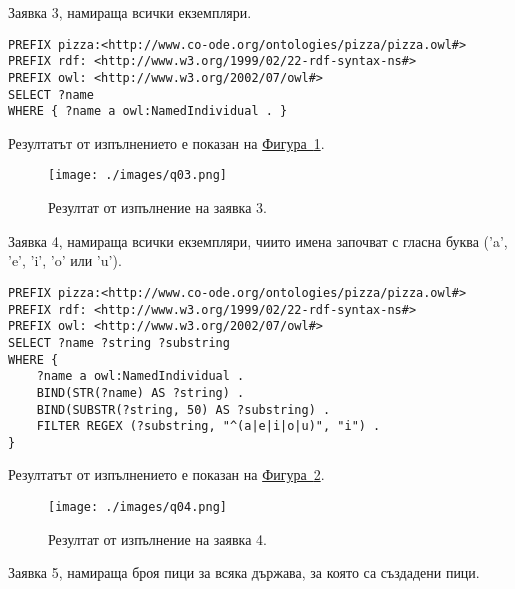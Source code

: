 \documentclass[12pt]{article}
\begin{document}
        Заявка 3, намираща всички екземпляри.
        
        \begin{lstlisting}[language=SPARQL,style=sparql]
PREFIX pizza:<http://www.co-ode.org/ontologies/pizza/pizza.owl#>
PREFIX rdf: <http://www.w3.org/1999/02/22-rdf-syntax-ns#>
PREFIX owl: <http://www.w3.org/2002/07/owl#>
SELECT ?name
WHERE { ?name a owl:NamedIndividual . }\end{lstlisting}

        Резултатът от изпълнението е показан на \hyperref[fig:q03]{Фигура~\ref*{fig:q03}}.

        \begin{center}
            \begin{figure}
            \centering
                \texttt{[image: ./images/q03.png]}
                \caption{Резултат от изпълнение на заявка 3.}
                \label{fig:q03}
            \end{figure}
        \end{center}

\clearpage
\pagebreak

        Заявка 4, намираща всички екземпляри, чиито имена започват с гласна буква ('a', 'e', 'i', 'o' или 'u').
        
        \begin{lstlisting}[language=SPARQL,style=sparql]
PREFIX pizza:<http://www.co-ode.org/ontologies/pizza/pizza.owl#>
PREFIX rdf: <http://www.w3.org/1999/02/22-rdf-syntax-ns#>
PREFIX owl: <http://www.w3.org/2002/07/owl#>
SELECT ?name ?string ?substring
WHERE {
    ?name a owl:NamedIndividual .
    BIND(STR(?name) AS ?string) .
    BIND(SUBSTR(?string, 50) AS ?substring) .
    FILTER REGEX (?substring, "^(a|e|i|o|u)", "i") .
}\end{lstlisting}

        Резултатът от изпълнението е показан на \hyperref[fig:q04]{Фигура~\ref*{fig:q04}}.

        \begin{center}
            \begin{figure}
            \centering
                \texttt{[image: ./images/q04.png]}
                \caption{Резултат от изпълнение на заявка 4.}
                \label{fig:q04}
            \end{figure}
        \end{center}

\clearpage
\pagebreak

        Заявка 5, намираща броя пици за всяка държава, за която са създадени пици.
        
\end{document}
